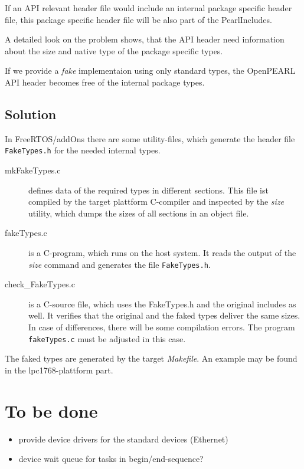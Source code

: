 If an API relevant header file would include an internal package specific
header file, this package specific header file will be also part of 
the PearlIncludes. 

A detailed look on the problem shows, that the API header need 
information about the size and native type of the package specific types.

If we provide a {\em fake} implementaion using only standard types,
the OpenPEARL API header becomes free of the internal package types.

\subsection{Solution}
In FreeRTOS/addOns there are some utility-files, which generate the header file 
\verb|FakeTypes.h| for the needed internal types.

\begin{description}
\item[mkFakeTypes.c] defines data of the required types in different sections.
This file ist compiled by the target plattform C-compiler and inspected by
the {\em size} utility, which dumps the sizes of all sections in an object file.
\item[fakeTypes.c] is a C-program, which runs on the host system. It reads
the output of the {\em size} command and generates the file \verb|FakeTypes.h|.
\item[check\_FakeTypes.c] is a C-source file, which uses the FakeTypes.h and 
the original includes as well. It verifies that the original and
the faked types deliver the same sizes. In case of differences, there will be
some compilation errors. The program \verb|fakeTypes.c| must be adjusted
in this case.
\end{description}

The faked types are generated by the target {\em Makefile}.
An example may be found in the lpc1768-plattform part.

\section{To be done}
  \begin{itemize}
  \item provide device drivers for the standard devices (Ethernet)
  \item device wait queue for tasks in begin/end-sequence?
  \end{itemize}


